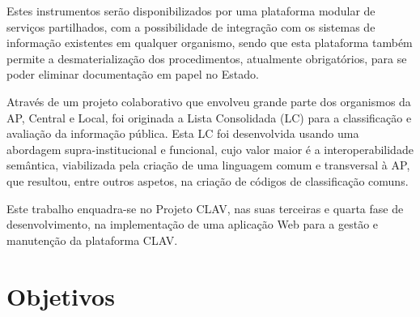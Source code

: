 Estes instrumentos serão disponibilizados por uma plataforma modular de serviços partilhados, com a possibilidade de integração com os sistemas de informação existentes em qualquer organismo, sendo que esta plataforma também permite a desmaterialização dos procedimentos, atualmente obrigatórios, para se poder eliminar documentação em papel no Estado.

Através de um projeto colaborativo que envolveu grande parte dos organismos da AP, Central e Local, foi originada a Lista Consolidada (LC) para a classificação e avaliação da informação pública. Esta LC foi desenvolvida usando uma abordagem supra-institucional e funcional, cujo valor maior é a interoperabilidade semântica, viabilizada pela criação de uma linguagem comum e transversal à AP, que resultou, entre outros aspetos, na criação de códigos de classificação comuns.

Este trabalho enquadra-se no Projeto CLAV, nas suas terceiras e quarta fase de desenvolvimento, na implementação de uma aplicação Web para a gestão e manutenção da plataforma CLAV. 

\section{Objetivos}